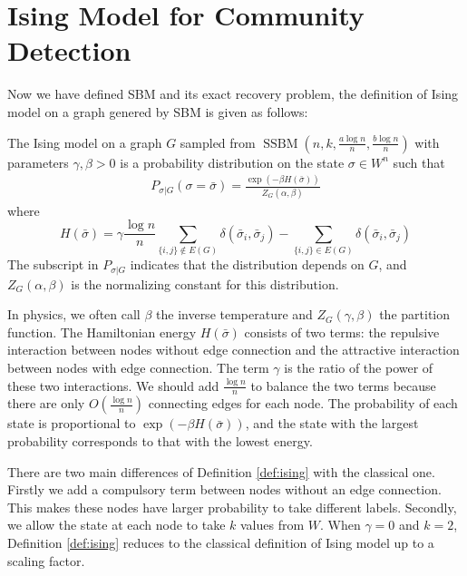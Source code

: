 \documentclass[entropy,article,submit,moreauthors,pdftex]{Definitions/mdpi}
\newcommand{\A}{\frac{a \log n}{n}}
\newcommand{\B}{\frac{b \log n}{n}}
\newcommand{\1}{\mathbbm{1}}
\DeclareMathOperator{\SSBM}{SSBM}
\begin{document}
\section{Ising Model for Community Detection}\label{sec:sibm}
Now we have defined SBM and its exact recovery problem, the definition of Ising model on a graph genered by SBM is given
as follows:
\begin{Definition}\label{def:ising}
	The Ising model on a graph $G$ sampled from $\SSBM(n,k,\A,\B)$ with parameters $\gamma,\beta>0$
	is a probability distribution on the state $\sigma\in W^n$ such that
	\begin{align} \label{eq:isingma}
	P_{\sigma|G}(\sigma=\bar{\sigma})=\frac{\exp(-\beta H(\bar{\sigma}))}{Z_G(\alpha,\beta)}
	\end{align}
	where
	\begin{equation}\label{eq:energy}
	H(\bar{\sigma}) = \gamma \frac{\log n}{n} \sum_{\{i,j\}\not\in E(G)} \delta(\bar{\sigma}_i, \bar{\sigma}_j)
	- \sum_{\{i,j\}\in E(G)} \delta(\bar{\sigma}_i, \bar{\sigma}_j)
	\end{equation}
	The subscript in $P_{\sigma|G}$ indicates that the distribution depends on $G$, and
	$Z_G(\alpha,\beta)$ is the normalizing constant for this distribution.
\end{Definition}
In physics, we often call $\beta$ the inverse temperature and $Z_G(\gamma, \beta)$ the partition function.
The Hamiltonian energy $H(\bar{\sigma})$ consists of two terms: the repulsive interaction between nodes without edge connection
and the attractive interaction between nodes with edge connection. The term $\gamma$ is the ratio of the power of these two
interactions. We should add $\frac{\log n}{n}$ to balance the two terms because there are only $O(\frac{\log n}{n})$
connecting edges for each node.
The probability of each state is proportional to $\exp(-\beta H(\bar{\sigma}))$, and the state with the largest
probability corresponds to that with the lowest energy.

There are two main differences of Definition \ref{def:ising} with the classical one. Firstly we add a compulsory term
between nodes without an edge connection. This makes these nodes have larger probability to take different labels.
Secondly, we allow the state at each node to take $k$ values from $W$.
When $\gamma = 0$ and $k=2$, Definition \ref{def:ising}
reduces to the classical definition of Ising model up to a scaling factor.
\end{document}
